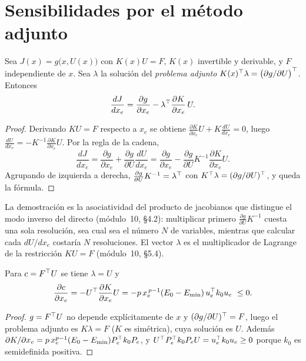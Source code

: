 \section{Sensibilidades por el método adjunto}

\begin{teorema}\label{teo:adjunto}
Sea $J(x)=g\bigl(x,U(x)\bigr)$ con $K(x)U=F$, $K(x)$ invertible y derivable, y $F$ independiente de $x$. Sea $\lambda$ la solución del \emph{problema adjunto} $K(x)^\top\lambda=\bigl(\partial g/\partial U\bigr)^\top$. Entonces
\[
\frac{dJ}{dx_e}=\frac{\partial g}{\partial x_e}-\lambda^\top\frac{\partial K}{\partial x_e}\,U .
\]
\end{teorema}

\begin{proof}
Derivando $KU=F$ respecto a $x_e$ se obtiene $\frac{\partial K}{\partial x_e}U+K\frac{dU}{dx_e}=0$, luego $\frac{dU}{dx_e}=-K^{-1}\frac{\partial K}{\partial x_e}U$. Por la regla de la cadena,
\[
\frac{dJ}{dx_e}=\frac{\partial g}{\partial x_e}+\frac{\partial g}{\partial U}\frac{dU}{dx_e}=\frac{\partial g}{\partial x_e}-\frac{\partial g}{\partial U}K^{-1}\frac{\partial K}{\partial x_e}U .
\]
Agrupando de izquierda a derecha, $\frac{\partial g}{\partial U}K^{-1}=\lambda^\top$ con $K^\top\lambda=(\partial g/\partial U)^\top$, y queda la fórmula.
\end{proof}

La demostración es la asociatividad del producto de jacobianos que distingue el modo inverso del directo (módulo~10, §4.2): multiplicar primero $\frac{\partial g}{\partial U}K^{-1}$ cuesta una sola resolución, sea cual sea el número $N$ de variables, mientras que calcular cada $dU/dx_e$ costaría $N$ resoluciones. El vector $\lambda$ es el multiplicador de Lagrange de la restricción $KU=F$ (módulo~10, §5.4).

\begin{corolario}\label{cor:autoadjunto}
Para $c=F^\top U$ se tiene $\lambda=U$ y
\[
\frac{\partial c}{\partial x_e}=-U^\top\frac{\partial K}{\partial x_e}U=-p\,x_e^{\,p-1}(E_0-E_{\min})\,u_e^\top k_0u_e\ \le 0 .
\]
\end{corolario}

\begin{proof}
$g=F^\top U$ no depende explícitamente de $x$ y $(\partial g/\partial U)^\top=F$, luego el problema adjunto es $K\lambda=F$ ($K$ es simétrica), cuya solución es $U$. Además $\partial K/\partial x_e=p\,x_e^{p-1}(E_0-E_{\min})P_e^\top k_0P_e$, y $U^\top P_e^\top k_0P_eU=u_e^\top k_0u_e\ge 0$ porque $k_0$ es semidefinida positiva.
\end{proof}

